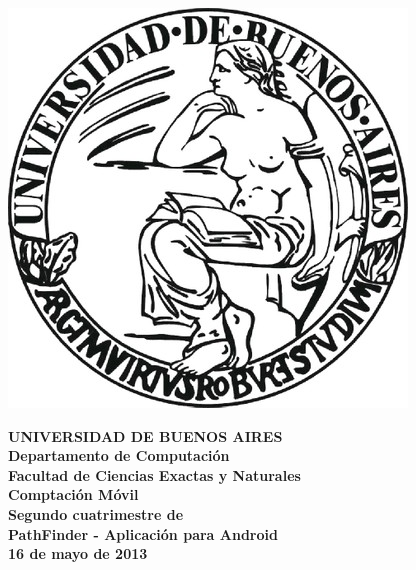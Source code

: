 \documentclass[a4paper]{article}
\begin{document}


\def\Materia{Comptación Móvil}
\def\Titulo{\LARGE PathFinder - Aplicación para Android}
\def\Grupo{ (borrame) }

\def\Fecha{16 de mayo de 2013}


\thispagestyle{empty}

\begin{center}
	\includegraphics[scale = 0.25]{imagenes/logo_uba.jpg}
\end{center}

\vspace{5mm}

\begin{center}
	{\textbf{\large UNIVERSIDAD DE BUENOS AIRES}}\\[1.5em]
	{\textbf{\large Departamento de Computaci\'{o}n}}\\[1.5em]
    {\textbf{\large Facultad de Ciencias Exactas y Naturales}}\\
    \vspace{20mm}
    {\LARGE\textbf{\Materia}}\\[1em]    
    \vspace{5mm}
    {\LARGE\textbf{Segundo cuatrimestre de \elanio}}\\
    \vspace{15mm}
    {\Large \textbf{\Titulo}}\\[1em]
    \vspace{15mm}
    {\textbf{\Large \Fecha}}\\ 
     \vspace{5mm}
   
   \vspace{10mm}
    \textbf{\tablaints}

    \end{center}
\end{document}
